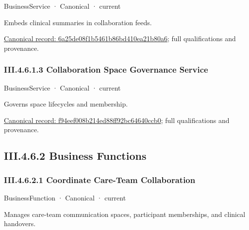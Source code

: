 \label{element:6a25de08f1b5461b86bd410ea21b80a6}
{\small BusinessService · Canonical · current}\par

Embeds clinical summaries in collaboration feeds.


{\footnotesize \href{../../../../continuum/business/business-service/6a25de08f1b5461b86bd410ea21b80a6.md}{Canonical record: 6a25de08f1b5461b86bd410ea21b80a6}; full qualifications and provenance.}\par
\subsubsection*{III.4.6.1.3 Collaboration Space Governance Service}
\label{navigation:III.4.6.1.3}

\label{element:f94eef008b214ed88ff92bc64640ccb0}
{\small BusinessService · Canonical · current}\par

Governs space lifecycles and membership.


{\footnotesize \href{../../../../continuum/business/business-service/f94eef008b214ed88ff92bc64640ccb0.md}{Canonical record: f94eef008b214ed88ff92bc64640ccb0}; full qualifications and provenance.}\par
\subsection*{III.4.6.2 Business Functions}
\label{navigation:III.4.6.2}

\subsubsection*{III.4.6.2.1 Coordinate Care-Team Collaboration}
\label{navigation:III.4.6.2.1}

\label{element:5443b253f0e4425f984702d396e77a3d}
{\small BusinessFunction · Canonical · current}\par

Manages care-team communication spaces, participant memberships, and clinical handovers.



